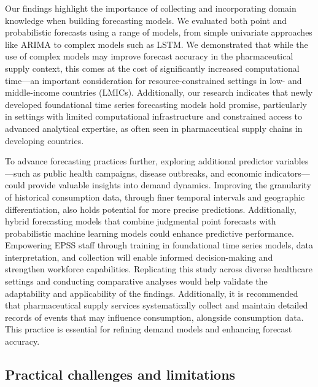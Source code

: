 \documentclass[
  authoryear,
  preprint,
  3p]{elsarticle}
\begin{document}
Our findings highlight the importance of collecting and incorporating
domain knowledge when building forecasting models. We evaluated both
point and probabilistic forecasts using a range of models, from simple
univariate approaches like ARIMA to complex models such as LSTM. We
demonstrated that while the use of complex models may improve forecast
accuracy in the pharmaceutical supply context, this comes at the cost of
significantly increased computational time---an important consideration
for resource-constrained settings in low- and middle-income countries
(LMICs). Additionally, our research indicates that newly developed
foundational time series forecasting models hold promise, particularly
in settings with limited computational infrastructure and constrained
access to advanced analytical expertise, as often seen in pharmaceutical
supply chains in developing countries.

To advance forecasting practices further, exploring additional predictor
variables---such as public health campaigns, disease outbreaks, and
economic indicators---could provide valuable insights into demand
dynamics. Improving the granularity of historical consumption data,
through finer temporal intervals and geographic differentiation, also
holds potential for more precise predictions. Additionally, hybrid
forecasting models that combine judgmental point forecasts with
probabilistic machine learning models could enhance predictive
performance. Empowering EPSS staff through training in foundational time
series models, data interpretation, and collection will enable informed
decision-making and strengthen workforce capabilities. Replicating this
study across diverse healthcare settings and conducting comparative
analyses would help validate the adaptability and applicability of the
findings. Additionally, it is recommended that pharmaceutical supply
services systematically collect and maintain detailed records of events
that may influence consumption, alongside consumption data. This
practice is essential for refining demand models and enhancing forecast
accuracy.

\subsection{Practical challenges and
limitations}\label{practical-challenges-and-limitations}
\end{document}
